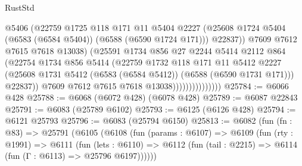 \begin{lexlean}{RustStd}
\begin{coremodule}
                                    @5406
                                    (@22759
                                      @1725
                                      @118
                                      @171
                                      @11
                                      @5404
                                      @2227
                                      (@25608
                                        @1724
                                        @5404
                                        (@6583 (@6584 @5404))
                                        (@6588 (@6590 @1724 @171)))
                                      @22837))
                                  @7609
                                  @7612
                                  @7615
                                  @7618
                                  @13038)
                                (@25591
                                  @1734
                                  @856
                                  @27
                                  @2244
                                  @5414
                                  @2112
                                  @864
                                  (@22754
                                    @1734
                                    @856
                                    @5414
                                    (@22759
                                      @1732
                                      @118
                                      @171
                                      @11
                                      @5412
                                      @2227
                                      (@25608
                                        @1731
                                        @5412
                                        (@6583 (@6584 @5412))
                                        (@6588 (@6590 @1731 @171)))
                                      @22837))
                                  @7609
                                  @7612
                                  @7615
                                  @7618
                                  @13038)))))))))))))))
@25784 := @6066 @428
@25788 := @6068 (@6072 @428) (@6078 @428)
@25789 := @6087 @22843
@25791 := @6083 (@25789 @6102)
@25793 := @6125 (@6126 @428)
@25794 := @6121 @25793
@25796 := @6083 (@25794 @6150)
@25813 := @6082
    (fun (fn : @83) =>
    @25791
      (@6105
        (@6108
          (fun (params : @6107) =>
          @6109
            (fun (rty : @1991) =>
            @6111
              (fun (lets : @6110) =>
              @6112 (fun (tail : @2215) => @6114 (fun (Γ : @6113) => @25796 @6197))))))

\end{coremodule}
\end{lexlean}
